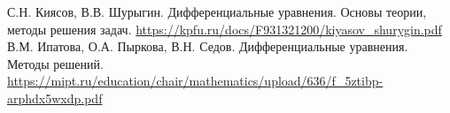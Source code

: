 \documentclass[12pt]{report}
\begin{document}
\begin{thebibliography}{9}
	С.Н. Киясов, В.В. Шурыгин. Дифференциальные уравнения. Основы теории, методы решения задач.
	\url{https://kpfu.ru/docs/F931321200/kiyasov_shurygin.pdf}
	В.М. Ипатова, О.А. Пыркова, В.Н. Седов. Дифференциальные уравнения. Методы решений.
	\url{https://mipt.ru/education/chair/mathematics/upload/636/f_5ztibp-arphdx5wxdp.pdf}
\end{thebibliography}
\end{document}
